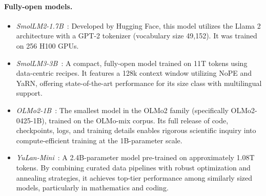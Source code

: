 \paragraph{Fully-open models.}
\begin{itemize}
    \item \textit{SmolLM2-1.7B}~\cite{smol2}: Developed by Hugging Face, this model utilizes the Llama 2 architecture with a GPT-2 tokenizer (vocabulary size 49,152). It was trained on 256 H100 GPUs.
    \item \textit{SmolLM3-3B}~\cite{smollm3}: A compact, fully-open model trained on 11T tokens using data-centric recipes. It features a 128k context window utilizing NoPE and YaRN, offering state-of-the-art performance for its size class with multilingual support.
    \item \textit{OLMo2-1B}~\cite{olmo20252olmo2furious}: The smallest model in the OLMo2 family (specifically OLMo2-0425-1B), trained on the OLMo-mix corpus. Its full release of code, checkpoints, logs, and training details enables rigorous scientific inquiry into compute-efficient training at the 1B-parameter scale.
    \item \textit{YuLan-Mini}~\cite{yiwen-etal-2025-yulan}: A 2.4B-parameter model pre-trained on approximately 1.08T tokens. By combining curated data pipelines with robust optimization and annealing strategies, it achieves top-tier performance among similarly sized models, particularly in mathematics and coding.
\end{itemize}

